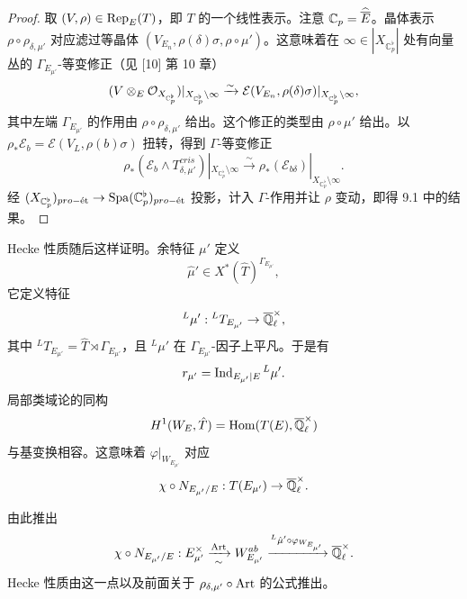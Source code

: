 \begin{proof}
取 $(V,\rho) \in \mathrm{Rep}_E(T)$，即 $T$ 的一个线性表示。注意 $\mathbb{C}_p = \widehat{\overline{E}}$。晶体表示 $\rho \circ \rho_{\delta,\mu'}$ 对应滤过等晶体 $(V_{E_n}, \rho(\delta)\sigma, \rho \circ \mu')$。这意味着在 $\infty \in |X_{\mathbb{C}_p^\flat}|$ 处有向量丛的 $\Gamma_{E_{\mu'}}$-等变修正（见 [10] 第 10 章）
\[
(V \otimes_E \mathcal{O}_{X_{\mathbb{C}_p^\flat}})|_{X_{\mathbb{C}_p^\flat} \setminus \infty}
\xrightarrow{\sim}
\mathcal{E}(V_{E_n}, \rho(\delta)\sigma)|_{X_{\mathbb{C}_p^\flat} \setminus \infty},
\]
其中左端 $\Gamma_{E_{\mu'}}$ 的作用由 $\rho \circ \rho_{\delta,\mu'}$ 给出。这个修正的类型由 $\rho \circ \mu'$ 给出。以 $\rho_* \mathcal{E}_b = \mathcal{E}(V_L, \rho(b)\sigma)$ 扭转，得到 $\Gamma$-等变修正
\[
\rho_*(\mathcal{E}_b \wedge T^{cris}_{\delta,\mu'})|_{X_{\mathbb{C}_p^\flat} \setminus \infty}
\xrightarrow{\sim}
\rho_*(\mathcal{E}_{b\delta})|_{X_{\mathbb{C}_p^\flat} \setminus \infty}.
\]
经 $(X_{\mathbb{C}_p^\flat})_{pro-\text{ét}} \to \mathrm{Spa}(\mathbb{C}_p^\flat)_{pro-\text{ét}}$ 投影，计入 $\Gamma$-作用并让 $\rho$ 变动，即得 9.1 中的结果。
\end{proof}

Hecke 性质随后这样证明。余特征 $\mu'$ 定义
\[
\hat\mu' \in X^*(\hat{T})^{\Gamma_{E_{\mu'}}},
\]
它定义特征
\[
{}^L\mu' : {}^L T_{E_{\mu'}} \to \overline{\mathbb{Q}}_\ell^\times,
\]
其中 ${}^L T_{E_{\mu'}} = \hat{T} \rtimes \Gamma_{E_{\mu'}}$，且 ${}^L\mu'$ 在 $\Gamma_{E_{\mu'}}$-因子上平凡。于是有
\[
r_{\mu'} = \operatorname{Ind}_{E_{\mu'}|E} {}^L\mu' .
\]
局部类域论的同构
\[
H^1(W_E, \hat{T}) = \operatorname{Hom}(T(E), \overline{\mathbb{Q}}_\ell^\times)
\]
与基变换相容。这意味着 $\varphi|_{W_{E_{\mu'}}}$ 对应
\[
\chi \circ N_{E_{\mu'}/E} : T(E_{\mu'}) \to \overline{\mathbb{Q}}_\ell^\times .
\]

\leavevmode{}由此推出
\[
\chi \circ N_{E_{\mu'}/E} : E^\times_{\mu'} \xrightarrow[\sim]{\operatorname{Art}} W^{ab}_{E_{\mu'}} \xrightarrow{{}^L\hat\mu' \circ \varphi_{W_{E_{\mu'}}}} \overline{\mathbb{Q}}_\ell^\times .
\]
Hecke 性质由这一点以及前面关于 $\rho_{\delta,\mu'} \circ \operatorname{Art}$ 的公式推出。
